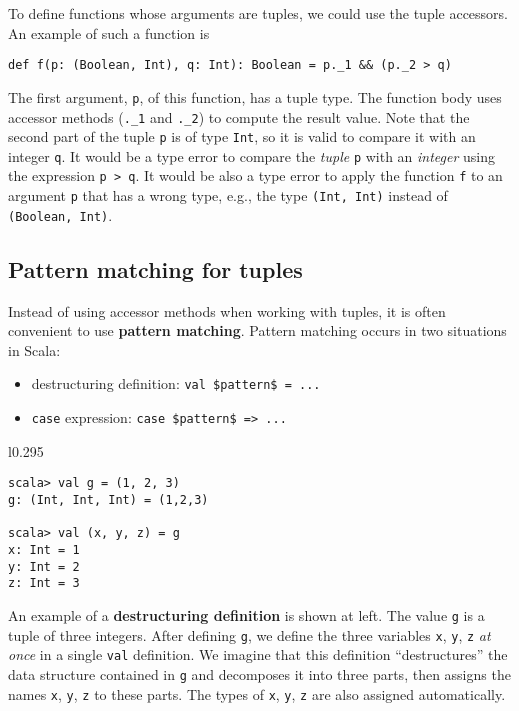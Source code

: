 To define functions whose arguments are tuples, we could use the tuple
accessors. An example of such a function is
\begin{lstlisting}
def f(p: (Boolean, Int), q: Int): Boolean = p._1 && (p._2 > q) 
\end{lstlisting}
The first argument, \lstinline!p!, of this function, has a tuple
type. The function body uses accessor methods (\lstinline!._1! and
\lstinline!._2!) to compute the result value. Note that the second
part of the tuple \lstinline!p! is of type \lstinline!Int!, so it
is valid to compare it with an integer \lstinline!q!. It would be
a type error to compare the \emph{tuple} \lstinline!p!
with an \emph{integer} using the expression \lstinline!p > q!. It
would be also a type error to apply the function \lstinline!f! to
an argument \lstinline!p! that has a wrong type, e.g., the type \lstinline!(Int, Int)!
instead of \lstinline!(Boolean, Int)!.

\subsection{Pattern matching for tuples}

Instead of using accessor methods when working with tuples, it is
often convenient to use \textbf{pattern matching}.
Pattern matching occurs in two situations in Scala:
\begin{itemize}
\item destructuring definition: \lstinline[mathescape=true]!val $pattern$ = ...!
\item \lstinline!case! expression: \lstinline[mathescape=true]!case $pattern$ => ...!
\end{itemize}
\begin{wrapfigure}{l}{0.295\columnwidth}%
\vspace{-0.8\baselineskip}
\begin{lstlisting}
scala> val g = (1, 2, 3)
g: (Int, Int, Int) = (1,2,3)

scala> val (x, y, z) = g
x: Int = 1
y: Int = 2
z: Int = 3
\end{lstlisting}
\vspace{-1.5\baselineskip}
\end{wrapfigure}%

An example of a \textbf{destructuring definition}
is shown at left. The value \lstinline!g! is a tuple of three integers.
After defining \lstinline!g!, we define the three variables \lstinline!x!,
\lstinline!y!, \lstinline!z! \emph{at once} in a single \lstinline!val!
definition. We imagine that this definition \textsf{``}destructures\textsf{''} the
data structure contained in \lstinline!g! and decomposes it into
three parts, then assigns the names \lstinline!x!, \lstinline!y!,
\lstinline!z! to these parts. The types of \lstinline!x!, \lstinline!y!,
\lstinline!z! are also assigned automatically.

